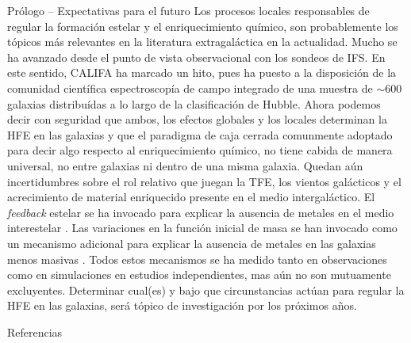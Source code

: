 \documentclass[xcolor=dvipsnames,4pt,hyperref={colorlinks,citecolor=black,linkcolor=black,urlcolor=black}]{beamer}
\begin{document}
\begin{frame}[allowframebreaks]{Prólogo -- Expectativas para el futuro}
%
Los procesos locales responsables de regular la formación estelar y el enriquecimiento químico, son
probablemente los tópicos más relevantes en la literatura extragaláctica en la actualidad. Mucho se
ha avanzado desde el punto de vista observacional con los sondeos de IFS. En este sentido, CALIFA ha
marcado un hito, pues ha puesto a la disposición de la comunidad científica espectroscopía de campo
integrado de una muestra de $\sim600$ galaxias distribuídas a lo largo de la clasificación de
Hubble. Ahora podemos decir con seguridad que ambos, los efectos globales y los locales determinan
la HFE en las galaxias y que el paradigma de caja cerrada comunmente adoptado para decir algo
respecto al enriquecimiento químico, no tiene cabida de manera universal, no entre galaxias ni
dentro de una misma galaxia. Quedan aún incertidumbres sobre el rol relativo que juegan la TFE, los
vientos galácticos y el acrecimiento de material enriquecido presente en el medio intergaláctico. El
\emph{feedback} estelar se ha invocado para explicar la ausencia de metales en el medio interestelar
\citep{Tremonti2004, Kobayashi2007}. Las variaciones en la función inicial de masa se han invocado
como un mecanismo adicional para explicar la ausencia de metales en las galaxias menos masivas
\citep{Koppen2007}. Todos estos mecanismos se ha medido tanto en observaciones como en simulaciones
en estudios independientes, mas aún no son mutuamente excluyentes. Determinar cual(es) y bajo que
circunstancias actúan para regular la HFE en las galaxias, será tópico de investigación por los
próximos años.
%
%
\end{frame}

\begin{frame}[allowframebreaks]{Referencias}
%
\printbibliography
\end{frame}
\end{document}
